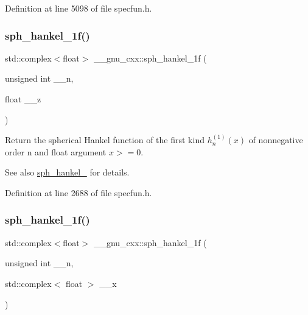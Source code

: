 Definition at line 5098 of file specfun.\+h.

\mbox{\label{group__gnu__math__spec__func_ga70d4fc01069f3f0ac0e3b52fe1dffea4}} 
\subsubsection{\texorpdfstring{sph\+\_\+hankel\+\_\+1f()}{sph\_hankel\_1f()}\hspace{0.1cm}{\footnotesize\ttfamily [1/2]}}
{\footnotesize\ttfamily std\+::complex$<$float$>$ \+\_\+\+\_\+gnu\+\_\+cxx\+::sph\+\_\+hankel\+\_\+1f (\begin{DoxyParamCaption}\item[{unsigned int}]{\+\_\+\+\_\+n,  }\item[{float}]{\+\_\+\+\_\+z }\end{DoxyParamCaption})\hspace{0.3cm}{\ttfamily [inline]}}

Return the spherical Hankel function of the first kind $ h^{(1)}_n(x) $ of nonnegative order n and {\ttfamily float} argument $ x >= 0 $.

\begin{DoxySeeAlso}{See also}
\hyperlink{group__gnu__math__spec__func_ga4424f565fb224ab88b177beb65d08305}{sph\+\_\+hankel\+\_} for details. 
\end{DoxySeeAlso}


Definition at line 2688 of file specfun.\+h.

\mbox{\label{group__gnu__math__spec__func_gadbb875cd50abb62ac75386143486bb2c}} 
\subsubsection{\texorpdfstring{sph\+\_\+hankel\+\_\+1f()}{sph\_hankel\_1f()}\hspace{0.1cm}{\footnotesize\ttfamily [2/2]}}
{\footnotesize\ttfamily std\+::complex$<$float$>$ \+\_\+\+\_\+gnu\+\_\+cxx\+::sph\+\_\+hankel\+\_\+1f (\begin{DoxyParamCaption}\item[{unsigned int}]{\+\_\+\+\_\+n,  }\item[{std\+::complex$<$ float $>$}]{\+\_\+\+\_\+x }\end{DoxyParamCaption})\hspace{0.3cm}{\ttfamily [inline]}}

